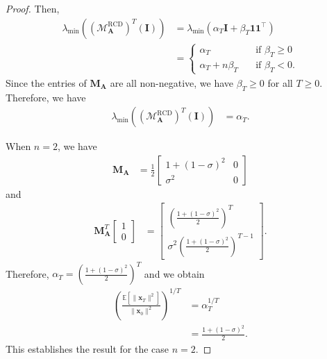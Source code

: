 \documentclass{article}
\theoremstyle{plain}
\theoremstyle{definition}
\theoremstyle{remark}
\def\bigopen#1{\left(#1\right)}
\def\bigclosed#1{\left[#1\right]}
\newcommand{\RCD}{\text{RCD}} %
\newcommand{\MARCD}{\mathcal{M}_{\bm{A}}^{\RCD}} %
\def\vone{{\bm{1}}}
\def\vx{{\bm{x}}}
\def\mA{{\bm{A}}}
\def\mI{{\bm{I}}}
\def\mM{{\bm{M}}}
\newcommand{\E}{\mathbb{E}}
\begin{document}
\begin{proof}
Then, 
\begin{align*}
    \lambda_{\min}((\MARCD)^T(\mI)) &= \lambda_{\min} (\alpha_T \mI + \beta_T \vone \vone^{\top}) \\
    &= \begin{cases}
        \alpha_T &\quad \text{if } \beta_T \ge 0 \\
        \alpha_T + n\beta_T &\quad \text{if } \beta_T < 0.
    \end{cases}
\end{align*}
Since the entries of $\mM_{\mA}$ are all non-negative, we have $\beta_T \ge 0$ for all $T\ge 0$. Therefore, we have 
\begin{align*}
    \lambda_{\min}((\MARCD)^T(\mI)) &= \alpha_T.
\end{align*}

When $n=2$, we have  
\begin{align*}
    \mM_{\mA} &= \frac{1}{2}\begin{bmatrix}
        1+(1-\sigma)^2 & 0 \\
        \sigma^2 & 0
    \end{bmatrix}
\end{align*}
and 
\begin{align*}
    \mM_{\mA}^T
    \begin{bmatrix}
        1\\
        0
    \end{bmatrix} &= 
    \begin{bmatrix}
        \bigopen{\frac{1+(1-\sigma)^2}{2}}^T\\
        \sigma^2 \bigopen{\frac{1+(1-\sigma)^2}{2}}^{T-1}
    \end{bmatrix}.
\end{align*}
Therefore, $\alpha_T = \bigopen{\frac{1+(1-\sigma)^2}{2}}^T$ and we obtain \begin{align*}
    \bigopen{\frac{\E\bigclosed{\|\vx_T\|^2}}{\|\vx_0\|^2}}^{1/T} &= \alpha_T^{1/T} \\
    &= \frac{1+(1-\sigma)^2}{2}.
\end{align*}
This establishes the result for the case $n=2$.


\end{proof}
\end{document}
